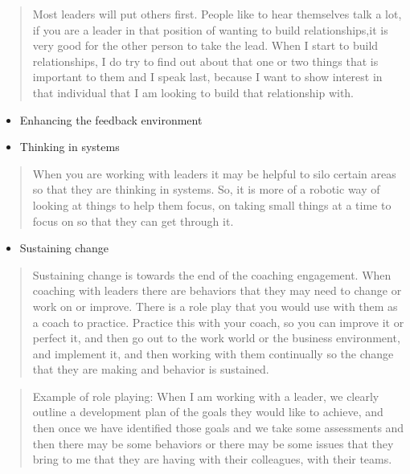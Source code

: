 \documentclass[]{book}
\begin{document}
\begin{quote}
Most leaders will put others first. People like to hear themselves talk a lot, if you are a leader in that position of wanting to build relationships,it is very good for the other person to take the lead. When I start to build relationships, I do try to find out about that one or two things that is important to them and I speak last, because I want to show interest in that individual that I am looking to build that relationship with.
\end{quote}

\begin{itemize}
\item
  Enhancing the feedback environment
\item
  Thinking in systems
\end{itemize}

\begin{quote}
When you are working with leaders it may be helpful to silo certain areas so that they are thinking in systems. So, it is more of a robotic way of looking at things to help them focus, on taking small things at a time to focus on so that they can get through it.
\end{quote}

\begin{itemize}
\item
  Sustaining change
\end{itemize}

\begin{quote}
Sustaining change is towards the end of the coaching engagement. When coaching with leaders there are behaviors that they may need to change or work on or improve. There is a role play that you would use with them as a coach to practice. Practice this with your coach, so you can improve it or perfect it, and then go out to the work world or the business environment, and implement it, and then working with them continually so the change that they are making and behavior is sustained.
\end{quote}

\begin{quote}
Example of role playing:
When I am working with a leader, we clearly outline a development plan of the goals they would like to achieve, and then once we have identified those goals and we take some assessments and then there may be some behaviors or there may be some issues that they bring to me that they are having with their colleagues, with their teams.
\end{quote}
\end{document}
